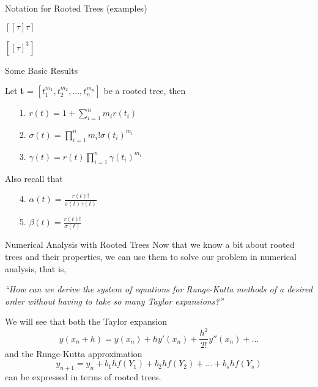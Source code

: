 \documentclass{beamer}
\begin{document}
\begin{frame}{Notation for Rooted Trees (examples)}
  \begin{multicols}{2}
  \begin{center}
    $\left[ \left[ \tau \right] \tau \right]$
    \end{center}
    
    \begin{center}
    $\left[ \left[\tau\right]^3 \right]$
    \end{center}
  \end{multicols}
\end{frame}

\begin{frame}{Some Basic Results}
  \begin{theorem}
  Let \textbf{t} = $\left[ t^{m_1}_1, t^{m_2}_2, \dots, t^{m_n}_n \right]$ be a rooted tree, then
  \begin{enumerate}
    \item[1.] $r(t) = 1 + \sum_{i = 1}^{n}{m_ir(t_i)}$
    \item[2.] $\sigma(t) = \prod_{i = 1}^{n}{m_i!\sigma(t_i)^{m_i}}$
    \item[3.] $\gamma(t) = r(t)\prod_{i = 1}^{n}{\gamma(t_i)^{m_i}}$
    \end{enumerate}
    Also recall that
    \begin{enumerate}
    \item[4.] $\alpha(t) = \frac{r(t)!}{\sigma(t)\gamma(t)}$
    \item[5.] $\beta(t) = \frac{r(t)!}{\sigma(t)}$
    \end{enumerate}
  \end{theorem}
\end{frame}

\begin{frame}{Numerical Analysis with Rooted Trees}
Now that we know a bit about rooted trees and their properties, we can use them to solve
our problem in numerical analysis, that is, \newline

\textit{``How can we derive the system of equations for Runge-Kutta
methods of a desired order without having to take so many Taylor expansions?''} \newline

We will see that both the Taylor expansion
$$y(x_n+h) = y(x_n) + hy'(x_n) + \frac{h^2}{2!}y''(x_n) + \dots$$
and the Runge-Kutta approximation
$$y_{n + 1} = y_n + b_1hf(Y_1) + b_2hf(Y_2) + \dots + b_shf(Y_s)$$
can be expressed in terms of rooted trees. 

\end{frame}
\end{document}
